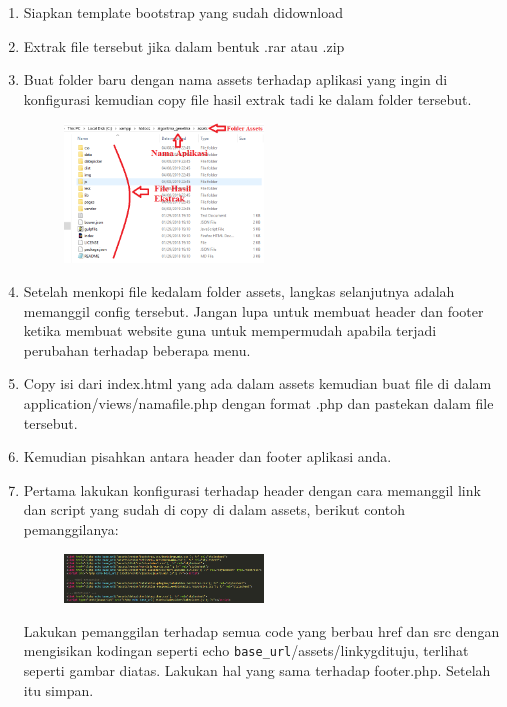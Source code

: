 \begin{enumerate}
    \item Siapkan template bootstrap yang sudah didownload
    \item Extrak file tersebut jika dalam bentuk .rar atau .zip
    \item Buat folder baru dengan nama assets terhadap aplikasi yang ingin di konfigurasi kemudian copy file hasil extrak tadi ke dalam folder tersebut.
		\begin{figure}[!htbp]
    		\centering
    		\includegraphics[width=0.5\textwidth]{figures/TBCI1.png}
    		\label{TBCI1}
		\end{figure}
		
	\item Setelah menkopi file kedalam folder assets, langkas selanjutnya adalah memanggil config tersebut. Jangan lupa untuk membuat header dan footer ketika membuat website guna untuk mempermudah apabila terjadi perubahan terhadap beberapa menu.
	\item Copy isi dari index.html yang ada dalam assets kemudian buat file di dalam application/views/namafile.php dengan format .php dan pastekan dalam file tersebut.
	\item Kemudian pisahkan antara header dan footer aplikasi anda.
	\item Pertama lakukan konfigurasi terhadap header dengan cara memanggil link dan script yang sudah di copy di dalam assets, berikut contoh pemanggilanya:
		\begin{figure}[!htbp]
    		\centering
    		\includegraphics[width=0.5\textwidth]{figures/TBCI2.PNG}
    		\label{TBCI2}
		\end{figure}
		\par Lakukan pemanggilan terhadap semua code yang berbau href dan src dengan mengisikan kodingan seperti echo \verb|base_url|/assets/linkygdituju, terlihat seperti gambar diatas. Lakukan hal yang sama terhadap footer.php. Setelah itu simpan.
		

\end{enumerate}
